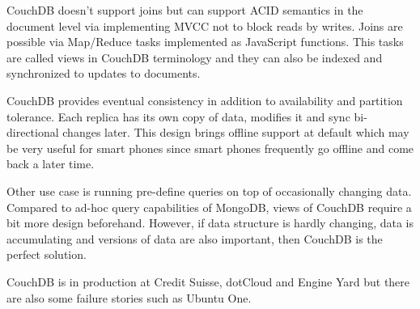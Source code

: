 CouchDB doesn't support joins but can support ACID semantics in the document level via implementing MVCC not to block reads by writes.
Joins are possible via Map/Reduce tasks implemented as JavaScript functions.
This tasks are called views in CouchDB terminology and they can also be indexed and synchronized to updates to documents.

CouchDB provides eventual consistency in addition to availability and partition tolerance.
Each replica has its own copy of data, modifies it and sync bi-directional changes later.
This design brings offline support at default which may be very useful for smart phones since smart phones frequently go offline and come back a later time.

Other use case is running pre-define queries on top of occasionally changing data.
Compared to ad-hoc query capabilities of MongoDB, views of CouchDB require a bit more design beforehand.
However, if data structure is hardly changing, data is accumulating and versions of data are also important, then CouchDB is the perfect solution.

CouchDB is in production at Credit Suisse, dotCloud and Engine Yard but there are also some failure stories such as Ubuntu One.

